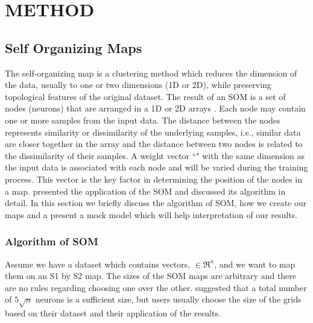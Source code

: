
\section{METHOD}
\label{sec: method}
 \subsection{Self Organizing Maps}
 \label{sec: som}
 
 The self-organizing map is a clustering method which reduces the dimension of the data, usually to one or two dimensions (1D or 2D), while preserving topological features of the original dataset.
 The result of an SOM is a set of nodes (neurons) that are arranged in a 1D or 2D arrays \citep{Kohonen98}. 
 Each node may contain one or more samples from the input data.
 The distance between the nodes represents similarity or dissimilarity of the underlying samples, i.e., similar data are closer together in the array and the distance between two nodes is related to the dissimilarity of their samples.
 A weight vector ``" with the same dimension as the input data is associated with each node and will be varied during the training process.
 This vector is the key factor in determining the position of the nodes in a map.
 \cite{Geach12} presented the application of the SOM and discussed its algorithm in detail.
 In this section we briefly discuss the algorithm of SOM, how we create our maps and a present a mock model which will help interpretation of our results. %
 
 \subsubsection{Algorithm of SOM} 
 \label{sec: algorithm}
     Assume we have a dataset which contains vectors,  $\in \Re^n$, and we want to map them on an S1 by S2 map.  %
     The sizes of the SOM maps are arbitrary and there are no rules regarding choosing one over the other. 
    \citet{Vesanto05} suggested that a total number of $5\sqrt{n}$ neurons is a sufficient size, but users usually choose the size of the grids based on their dataset and their application of the results.

